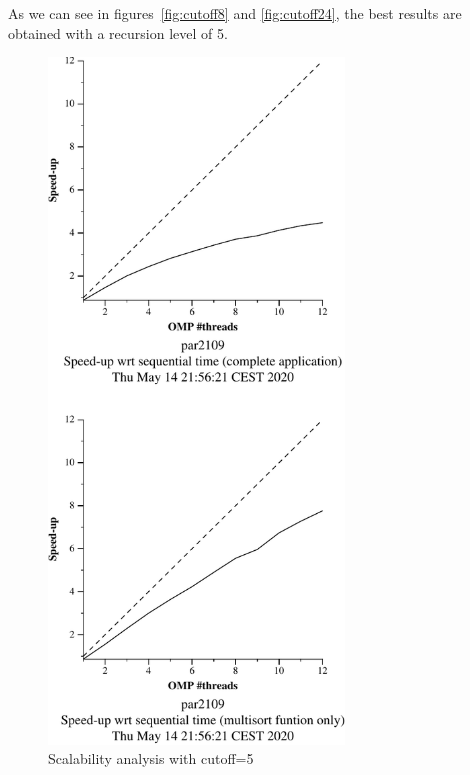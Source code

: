 As we can see in figures~\ref{fig:cutoff8} and \ref{fig:cutoff24}, the best results are obtained with a recursion
level of 5.

\begin{figure}[H]
    \begin{minipage}{0.5\textwidth}
        \centering
        \includegraphics[width=0.7\textwidth]{plots/new-omp-tree-cutoff-5-crop.pdf}
        \caption{Scalability analysis with cutoff=5}
        \label{fig:cutoff5} 
    \end{minipage}
    \begin{minipage}{0.5\textwidth}
        \centering

\end{minipage}
\end{figure}
